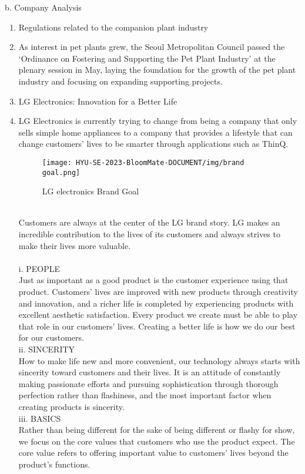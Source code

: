\documentclass[conference, a4paper]{IEEEtran}
\begin{document}
\indent b. Company Analysis
\begin{enumerate}
    \item Regulations related to the companion plant industry
    \item[] As interest in pet plants grew, the Seoul Metropolitan Council passed the ‘Ordinance on Fostering and Supporting the Pet Plant Industry’ at the plenary session in May, laying the foundation for the growth of the pet plant industry and focusing on expanding supporting projects.\cite{mediapen_article} \\
    
    \item LG Electronics: Innovation for a Better Life 
    \item[] LG Electronics is currently trying to change from being a company that only sells simple home appliances to a company that provides a lifestyle that can change customers' lives to be smarter through applications such as ThinQ.
    \begin{figure}[h]
\texttt{[image: HYU-SE-2023-BloomMate-DOCUMENT/img/brand goal.png]}
\label{fig:brand}
\caption{LG electronics Brand Goal} 
\end{figure}
\\
Customers are always at the center of the LG brand story. LG makes an incredible contribution to the lives of its customers and always strives to make their lives more valuable.\\
\\
\indent i. PEOPLE\\
Just as important as a good product is the customer experience using that product. Customers' lives are improved with new products through creativity and innovation, and a richer life is completed by experiencing products with excellent aesthetic satisfaction. Every product we create must be able to play that role in our customers’ lives. Creating a better life is how we do our best for our customers.\\

ii. SINCERITY \\
How to make life new and more convenient, our technology always starts with sincerity toward customers and their lives. It is an attitude of constantly making passionate efforts and pursuing sophistication through thorough perfection rather than flashiness, and the most important factor when creating products is sincerity.\\

iii. BASICS \\
Rather than being different for the sake of being different or flashy for show, we focus on the core values that customers who use the product expect. The core value refers to offering important value to customers' lives beyond the product's functions. \cite{lge_document}
\\
\end{enumerate}
\end{document}
